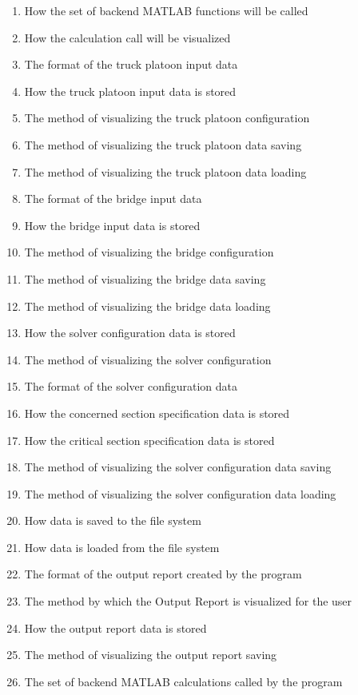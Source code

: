 \documentclass[12pt, titlepage]{article}
\begin{document}
\begin{enumerate}
    \item How the set of backend MATLAB functions will be called
    \item How the calculation call will be visualized
    \item The format of the truck platoon input data
    \item How the truck platoon input data is stored
    \item The method of visualizing the truck platoon configuration
    \item The method of visualizing the truck platoon data saving
    \item The method of visualizing the truck platoon data loading
    \item The format of the bridge input data
    \item How the bridge input data is stored
    \item The method of visualizing the bridge configuration
    \item The method of visualizing the bridge data saving
    \item The method of visualizing the bridge data loading
    \item How the solver configuration data is stored
    \item The method of visualizing the solver configuration
    \item The format of the solver configuration data
    \item How the concerned section specification data is stored
    \item How the critical section specification data is stored
    \item The method of visualizing the solver configuration data saving
    \item The method of visualizing the solver configuration data loading
    \item How data is saved to the file system 
    \item How data is loaded from the file system 
    \item The format of the output report created by the program
    \item The method by which the Output Report is visualized for the user
    \item How the output report data is stored
    \item The method of visualizing the output report saving
    \item The set of backend MATLAB calculations called by the program
\end{enumerate}    
\end{document}
